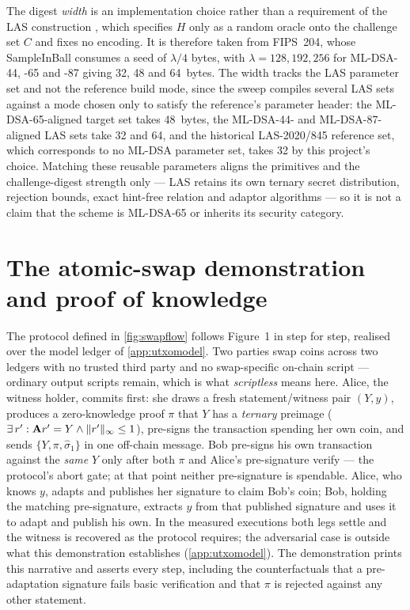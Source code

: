 The digest \emph{width} is an implementation choice rather than a requirement of the LAS
construction \cite{esgin2020post}, which specifies $H$ only as a random oracle onto the
challenge set $C$ and fixes no encoding. It is therefore taken from FIPS~204, whose
\textsf{SampleInBall} consumes a seed of $\lambda/4$ bytes, with $\lambda=128,192,256$
for ML-DSA-44, -65 and -87 giving 32, 48 and 64~bytes. The width tracks the LAS
parameter set and not the reference build mode, since the sweep compiles several LAS
sets against a mode chosen only to satisfy the reference's parameter header: the
ML-DSA-65-aligned target set takes 48~bytes, the ML-DSA-44- and ML-DSA-87-aligned LAS
sets take 32 and 64, and the historical LAS-2020/845 reference set, which corresponds
to no ML-DSA parameter set, takes 32 by this project's choice. Matching these reusable
parameters aligns the primitives and the challenge-digest strength only --- LAS retains
its own ternary secret distribution, rejection bounds, exact hint-free relation and
adaptor algorithms --- so it is not a claim that the scheme is ML-DSA-65 or inherits its
security category.

\section{The atomic-swap demonstration and proof of knowledge}
\label{app:swapdemo}

The protocol defined in \cref{fig:swapflow} follows Figure~1 in
\cite{esgin2020post} step for step, realised over the model ledger
of \cref{app:utxomodel}. Two parties swap coins across two ledgers with no
trusted third party and no swap-specific on-chain script --- ordinary output scripts
remain, which is what \emph{scriptless} means here. Alice, the witness holder, commits first:
she draws a fresh statement/witness pair $(Y,y)$, produces a zero-knowledge proof $\pi$
that $Y$ has a \emph{ternary} preimage
($\exists\, r' : \mathbf{A}r' = Y \wedge \lVert r' \rVert_\infty \le 1$), pre-signs the
transaction spending her own coin, and sends $\{Y, \pi, \hat{\sigma}_1\}$ in one
off-chain message. Bob pre-signs his own transaction against the \emph{same} $Y$ only
after both $\pi$ and Alice's pre-signature verify --- the protocol's abort gate; at that
point neither pre-signature is spendable. Alice, who knows $y$, adapts and publishes her
signature to claim Bob's coin; Bob, holding the matching pre-signature, extracts $y$ from
that published signature and uses it to adapt and publish his own. In the measured
executions both legs settle and the witness is recovered as the protocol requires; the
adversarial case is outside what this demonstration establishes (\cref{app:utxomodel}).
The demonstration prints this narrative and asserts every step, including the
counterfactuals that a pre-adaptation signature fails basic verification and that $\pi$
is rejected against any other statement.


